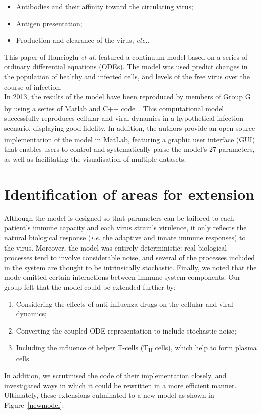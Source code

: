 \documentclass[a4paper, 12pt]{report}
\begin{document}
\begin{itemize}
\item Antibodies and their affinity toward the circulating virus;
\item Antigen presentation;
\item Production and clearance of the virus, \textit{etc.}.
\end{itemize}

This paper of Hancioglu \textit{et al.} featured a continuum model based on a series of ordinary differential equations (ODEs). The model was used predict changes in the population of healthy and infected cells, and levels of the free virus over the course of infection. \\

In 2013, the results of the model have been reproduced by members of Group G by using a series of Matlab\textsuperscript{\textregistered} and C++ code~\cite{GroupG}. This computational model successfully reproduces cellular and viral dynamics in a hypothetical infection scenario, displaying good fidelity. In addition, the authors provide an open-source implementation of the model in MatLab\textsuperscript{\textregistered}, featuring a graphic user interface (GUI) that enables users to control and systematically parse the model's 27 parameters, as well as facilitating the visualisation of multiple datasets. \\

\section{Identification of areas for extension}

Although the model is designed so that parameters can be tailored to each patient's immune capacity and each virus strain's virulence, it only reflects the natural biological response (\textit{i.e.} the adaptive and innate immune responses) to the virus. Moreover, the model was entirely deterministic: real biological processes tend to involve considerable noise, and several of the processes included in the system are thought to be intrinsically stochastic. Finally, we noted that the mode omitted certain interactions between immune system components.
Our group felt that the model could be extended further by:
\begin{enumerate}
\item Considering the effects of anti-influenza drugs on the cellular and viral dynamics;
\item Converting the coupled ODE representation to include stochastic noise;
\item Including the influence of helper T-cells (T\textsubscript{H} cells), which help to form plasma cells.
\end{enumerate}
In addition, we scrutinised the code of their implementation closely, and investigated ways in which it could be rewritten in a more efficient manner. Ultimately, these extensions culminated to a new model as shown in Figure~\ref{newmodel}:
\end{document}
